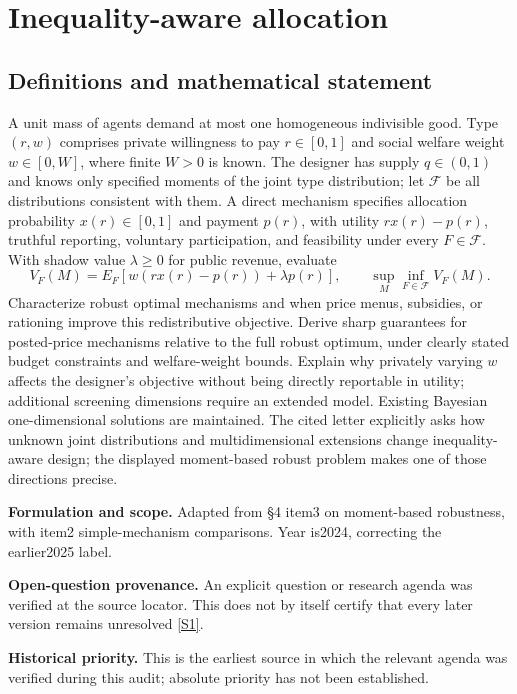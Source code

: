 \documentclass[11pt]{article}
\newcommand{\sref}[2]{\hyperlink{source:#1:#2}{[S#2]}}
\begin{document}
\section*{Inequality-aware allocation}\label{30007578}
\subsection{Definitions and mathematical statement}
A unit mass of agents demand at most one homogeneous indivisible good. Type \((r,w)\) comprises private willingness to pay \(r\in[0,1]\) and social welfare weight \(w\in[0,W]\), where finite \(W>0\) is known. The designer has supply \(q\in(0,1)\) and knows only specified moments of the joint type distribution; let \(\mathcal F\) be all distributions consistent with them. A direct mechanism specifies allocation probability \(x(r)\in[0,1]\) and payment \(p(r)\), with utility \(r x(r)-p(r)\), truthful reporting, voluntary participation, and feasibility under every \(F\in\mathcal F\). With shadow value \(\lambda\geq0\) for public revenue, evaluate
\[
 V_F(M)=E_F[w(r x(r)-p(r))+\lambda p(r)],\qquad
 \sup_M\inf_{F\in\mathcal F}V_F(M).
\]
Characterize robust optimal mechanisms and when price menus, subsidies, or rationing improve this redistributive objective. Derive sharp guarantees for posted-price mechanisms relative to the full robust optimum, under clearly stated budget constraints and welfare-weight bounds. Explain why privately varying \(w\) affects the designer's objective without being directly reportable in utility; additional screening dimensions require an extended model. Existing Bayesian one-dimensional solutions are maintained. The cited letter explicitly asks how unknown joint distributions and multidimensional extensions change inequality-aware design; the displayed moment-based robust problem makes one of those directions precise.

\par\textbf{Formulation and scope.} Adapted from §4 item3 on moment-based robustness, with item2 simple-mechanism comparisons. Year is2024, correcting the earlier2025 label.

\par\textbf{Open-question provenance.} An explicit question or research agenda was verified at the source locator. This does not by itself certify that every later version remains unresolved \sref{30007578}{1}.

\par\textbf{Historical priority.} This is the earliest source in which the relevant agenda was verified during this audit; absolute priority has not been established.
\end{document}
